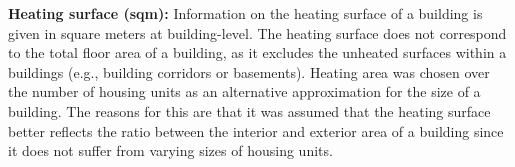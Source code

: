 \documentclass[12pt,twoside]{reedthesis}
\begin{document}
\textbf{Heating surface (sqm):} Information on the heating surface of a building is given in square meters at building-level. The heating surface does not correspond to the total floor area of a building, as it excludes the unheated surfaces within a buildings (e.g., building corridors or basements). Heating area was chosen over the number of housing units as an alternative approximation for the size of a building. The reasons for this are that it was assumed that the heating surface better reflects the ratio between the interior and exterior area of a building since it does not suffer from varying sizes of housing units.
\begin{table}[]
\centering
\caption{Variables and data sources}
\label{tab:variables}
\end{table}
\end{document}
